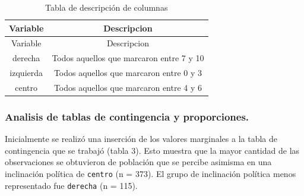 \documentclass[
]{article}
\begin{document}
\begin{longtable}[]{@{}cc@{}}
\caption{Tabla de descripción de columnas}\tabularnewline
\toprule
\begin{minipage}[b]{0.16\columnwidth}\centering
Variable\strut
\end{minipage} & \begin{minipage}[b]{0.39\columnwidth}\centering
Descripcion\strut
\end{minipage}\tabularnewline
\midrule
\endfirsthead
\toprule
\begin{minipage}[b]{0.16\columnwidth}\centering
Variable\strut
\end{minipage} & \begin{minipage}[b]{0.39\columnwidth}\centering
Descripcion\strut
\end{minipage}\tabularnewline
\midrule
\endhead
\begin{minipage}[t]{0.16\columnwidth}\centering
derecha\strut
\end{minipage} & \begin{minipage}[t]{0.39\columnwidth}\centering
Todos aquellos que marcaron entre 7 y 10\strut
\end{minipage}\tabularnewline
\begin{minipage}[t]{0.16\columnwidth}\centering
izquierda\strut
\end{minipage} & \begin{minipage}[t]{0.39\columnwidth}\centering
Todos aquellos que marcaron entre 0 y 3\strut
\end{minipage}\tabularnewline
\begin{minipage}[t]{0.16\columnwidth}\centering
centro\strut
\end{minipage} & \begin{minipage}[t]{0.39\columnwidth}\centering
Todos aquellos que marcaron entre 4 y 6\strut
\end{minipage}\tabularnewline
\bottomrule
\end{longtable}

\hypertarget{analisis-de-tablas-de-contingencia-y-proporciones.}{%
\subsubsection{Analisis de tablas de contingencia y
proporciones.}\label{analisis-de-tablas-de-contingencia-y-proporciones.}}

Inicialmente se realizó una inserción de los valores marginales a la
tabla de contingencia que se trabajó (tabla 3). Esto muestra que la
mayor cantidad de las observaciones se obtuvieron de población que se
percibe asimisma en una inclinación política de \texttt{centro} (n =
373). El grupo de inclinación política menos representado fue
\texttt{derecha} (n = 115).
\end{document}

